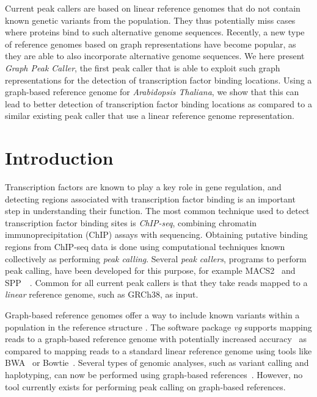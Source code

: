 \documentclass[10pt,letterpaper]{article}
\begin{document}
Current peak callers are based on linear reference genomes that do not contain known genetic variants from the population.
They thus potentially miss cases where proteins bind to such alternative genome sequences.
Recently, a new type of reference genomes based on graph representations have become popular, as they are able to also incorporate alternative genome sequences.
We here present \emph{Graph Peak Caller}, the first peak caller that is able to exploit such graph representations for the detection of transcription factor binding locations.
Using a graph-based reference genome for \emph{Arabidopsis Thaliana}, we show that this can lead to better detection of transcription factor binding locations as compared to a similar existing peak caller that use a linear reference genome representation.

\linenumbers

\section*{Introduction}
Transcription factors are known to play a key role in gene regulation, and detecting regions associated with transcription factor binding is an important step in understanding their function. The most common technique used to detect transcription factor binding sites is \emph{ChIP-seq}, combining chromatin immunoprecipitation (ChIP) assays with sequencing. Obtaining putative binding regions from ChIP-seq data is done using computational techniques known collectively as performing \emph{peak calling}. Several \emph{peak callers}, programs to perform peak calling, have been developed for this purpose, for example MACS2~\cite{macs} and SPP~\cite{spp}~\cite{peak_caller_review}. Common for all current peak callers is that they take reads mapped to a \emph{linear} reference genome, such as GRCh38, as input. 

Graph-based reference genomes offer a way to include known variants within a population in the reference structure \cite{graph_evolution}. The software package \emph{vg} supports mapping reads to a graph-based reference genome with potentially increased accuracy~\cite{vg, genome_graphs} as compared to mapping reads to a standard linear reference genome using tools like BWA~\cite{bwa_mem} or Bowtie~\cite{bowtie}.
Several types of genomic analyses, such as variant calling and haplotyping, can now be performed using graph-based references~\cite{vg, genome_graphs}. However, no tool currently exists for performing peak calling on graph-based references. 
\end{document}
